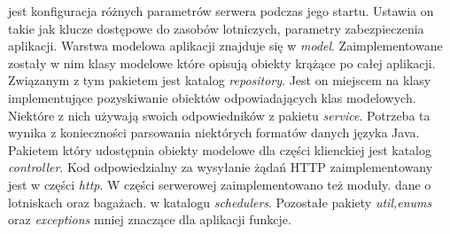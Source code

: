 \documentclass[12pt, twoside]{report}
\begin{document}
  jest konfiguracja różnych parametrów serwera podczas jego startu. Ustawia on takie  jak klucze dostępowe do zasobów lotniczych, parametry   zabezpieczenia aplikacji. Warstwa modelowa aplikacji znajduje się w  \textit{model}. Zaimplementowane zostały w nim klasy modelowe które opisują obiekty krążące  po całej aplikacji. Związanym z tym pakietem jest katalog \textit{repository}. Jest on miejscem na klasy implementujące pozyskiwanie obiektów odpowiadających klas modelowych.  Niektóre z nich używają swoich  odpowiedników z pakietu \textit{service}. Potrzeba ta wynika z konieczności parsowania niektórych formatów danych  języka Java. Pakietem który udostępnia obiekty modelowe dla części klienckiej jest katalog \textit{controller}. Kod odpowiedzialny za wysyłanie żądań HTTP zaimplementowany jest w części \textit{http}. W części serwerowej zaimplementowano też moduły.   dane o lotniskach oraz bagażach.  w katalogu \textit{schedulers}. Pozostałe pakiety \textit{util,enums} oraz \textit{exceptions}  mniej znaczące dla aplikacji funkcje.  
\end{document}
